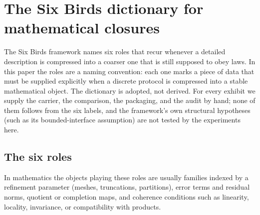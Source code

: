 \section{The Six Birds dictionary for mathematical closures}
\label{sec:dictionary}

The Six Birds framework \cite{SixBirdsFramework} names six roles that recur whenever a detailed description is compressed into a coarser one that is still supposed to obey laws.
In this paper the roles are a naming convention: each one marks a piece of data that must be supplied explicitly when a discrete protocol is compressed into a stable mathematical object.
The dictionary is adopted, not derived.
For every exhibit we supply the carrier, the comparison, the packaging, and the audit by hand; none of them follows from the six labels, and the framework's own structural hypotheses (such as its bounded-interface assumption) are not tested by the experiments here.

\subsection{The six roles}
In mathematics the objects playing these roles are usually families indexed by a refinement parameter (meshes, truncations, partitions), error terms and residual norms, quotient or completion maps, and coherence conditions such as linearity, locality, invariance, or compatibility with products.

